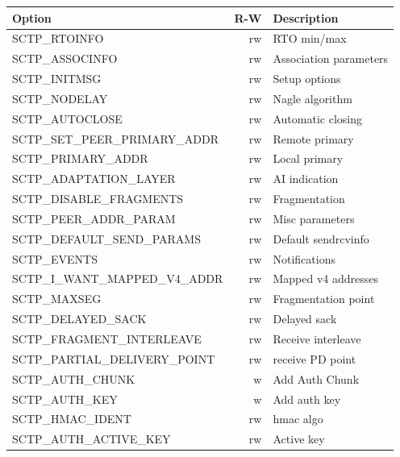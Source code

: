 \documentclass[conference]{IEEEtran}
\begin{document}
\begin{table}[h]
\begin{center}
\begin{tabular}{|l|r|l|}
\hline
Option                          & R-W & Description              \\\hline
\hline
SCTP\_RTOINFO                   & rw  & RTO min/max              \\\hline
SCTP\_ASSOCINFO                 & rw  & Association parameters   \\\hline
SCTP\_INITMSG                   & rw  & Setup options            \\\hline
SCTP\_NODELAY                   & rw  & Nagle algorithm          \\\hline
SCTP\_AUTOCLOSE                 & rw  & Automatic closing        \\\hline
SCTP\_SET\_PEER\_PRIMARY\_ADDR  & rw  & Remote primary           \\\hline
SCTP\_PRIMARY\_ADDR             & rw  & Local primary            \\\hline
SCTP\_ADAPTATION\_LAYER         & rw  & AI indication            \\\hline
SCTP\_DISABLE\_FRAGMENTS        & rw  & Fragmentation            \\\hline
SCTP\_PEER\_ADDR\_PARAM         & rw  & Misc parameters          \\\hline
SCTP\_DEFAULT\_SEND\_PARAMS     & rw  & Default sendrcvinfo      \\\hline
SCTP\_EVENTS                    & rw  & Notifications            \\\hline
SCTP\_I\_WANT\_MAPPED\_V4\_ADDR & rw  & Mapped v4 addresses      \\\hline
SCTP\_MAXSEG                    & rw  & Fragmentation point      \\\hline
SCTP\_DELAYED\_SACK             & rw  & Delayed sack             \\\hline
SCTP\_FRAGMENT\_INTERLEAVE      & rw  & Receive interleave       \\\hline
SCTP\_PARTIAL\_DELIVERY\_POINT  & rw  & receive PD point         \\\hline
SCTP\_AUTH\_CHUNK               & w   & Add Auth Chunk           \\\hline
SCTP\_AUTH\_KEY                 & w   & Add auth key             \\\hline
SCTP\_HMAC\_IDENT               & rw  & hmac algo                \\\hline
SCTP\_AUTH\_ACTIVE\_KEY         & rw  & Active key               \\\hline

\end{tabular}
\end{center}
\end{table}
\end{document}
